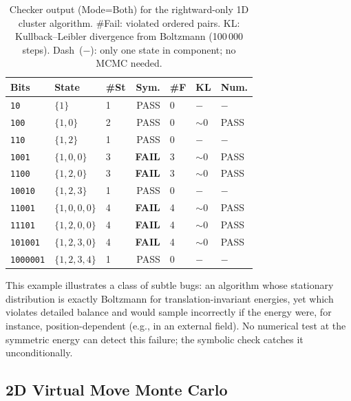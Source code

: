 \documentclass[twocolumn,10pt]{article}
\begin{document}
\begin{table}[t]
  \centering
  \caption{Checker output (Mode=Both) for the rightward-only 1D cluster
    algorithm.  \#Fail: violated ordered pairs.  KL: Kullback--Leibler
    divergence from Boltzmann (100\,000 steps).  Dash~($-$): only one
    state in component; no MCMC needed.}
  \label{tab:cluster}
  \small
  \setlength{\tabcolsep}{3pt}
  \begin{tabular}{@{}lllrlll@{}}
    \toprule
    Bits & State & \#St & Sym. & \#F & KL & Num. \\
    \midrule
    \texttt{10}      & $\{1\}$       & 1 & PASS         & 0 & $-$  & $-$  \\
    \texttt{100}     & $\{1,0\}$     & 2 & PASS         & 0 & ${\sim}0$ & PASS \\
    \texttt{110}     & $\{1,2\}$     & 1 & PASS         & 0 & $-$  & $-$  \\
    \texttt{1001}    & $\{1,0,0\}$   & 3 & \textbf{FAIL}& 3 & ${\sim}0$ & PASS \\
    \texttt{1100}    & $\{1,2,0\}$   & 3 & \textbf{FAIL}& 3 & ${\sim}0$ & PASS \\
    \texttt{10010}   & $\{1,2,3\}$   & 1 & PASS         & 0 & $-$  & $-$  \\
    \texttt{11001}   & $\{1,0,0,0\}$ & 4 & \textbf{FAIL}& 4 & ${\sim}0$ & PASS \\
    \texttt{11101}   & $\{1,2,0,0\}$ & 4 & \textbf{FAIL}& 4 & ${\sim}0$ & PASS \\
    \texttt{101001}  & $\{1,2,3,0\}$ & 4 & \textbf{FAIL}& 4 & ${\sim}0$ & PASS \\
    \texttt{1000001} & $\{1,2,3,4\}$ & 1 & PASS         & 0 & $-$  & $-$  \\
    \bottomrule
  \end{tabular}
\end{table}

This example illustrates a class of subtle bugs: an algorithm whose stationary
distribution is exactly Boltzmann for translation-invariant energies, yet which
violates detailed balance and would sample incorrectly if the energy were, for
instance, position-dependent (e.g., in an external field).  No numerical test
at the symmetric energy can detect this failure; the symbolic check catches it
unconditionally.

\subsection{2D Virtual Move Monte Carlo}
\label{sec:vmmc}
\end{document}
